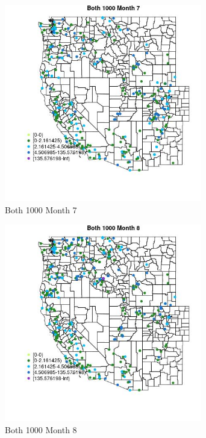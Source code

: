 \begin{figure} 
\centering  
\includegraphics[width=0.77\textwidth]{Code_Outputs/Report_ML_input_PM25_Step4_part_e_de_duplicated_aveswNAs_MapObsMo7Both_1000.jpg} 
\caption{\label{fig:Report_ML_input_PM25_Step4_part_e_de_duplicated_aveswNAsMapObsMo7Both_1000}Both 1000 Month 7} 
\end{figure} 
 

\begin{figure} 
\centering  
\includegraphics[width=0.77\textwidth]{Code_Outputs/Report_ML_input_PM25_Step4_part_e_de_duplicated_aveswNAs_MapObsMo8Both_1000.jpg} 
\caption{\label{fig:Report_ML_input_PM25_Step4_part_e_de_duplicated_aveswNAsMapObsMo8Both_1000}Both 1000 Month 8} 
\end{figure} 
 

